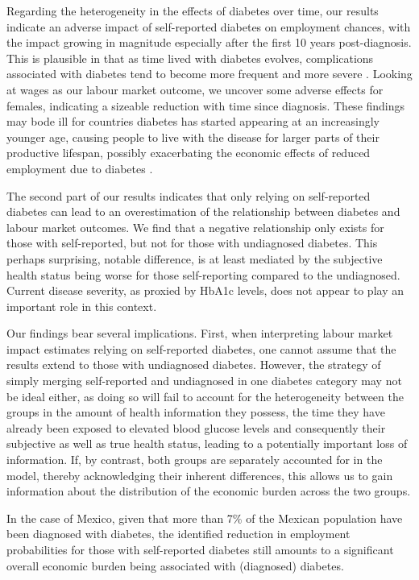 Regarding the heterogeneity in the effects of diabetes over time, our results indicate an adverse impact of self-reported diabetes on employment chances, with the impact growing in magnitude especially after the first 10 years post-diagnosis. This is plausible in that as time lived with diabetes evolves, complications associated with diabetes tend to become more frequent and more severe \parencite{Adler2003}. Looking at wages as our labour market outcome, we uncover some adverse effects for females, indicating a sizeable reduction with time since diagnosis. These findings may bode ill for countries \DIFdelbegin {}\DIFdelend \DIFaddbegin {}\DIFaddend diabetes has started appearing at an increasingly younger age, causing people to live with the disease for larger parts of their productive lifespan, possibly exacerbating the economic effects of reduced employment due to diabetes \parencite{Hu2011,Villalpando2010}.

The second part of our results indicates that only relying on self-reported diabetes can lead to an overestimation of the relationship between diabetes and labour market outcomes. We find that a negative relationship only exists for those with self-reported, but not for those with undiagnosed diabetes. This perhaps surprising, notable difference, is at least mediated by the subjective health status being worse for those self-reporting compared to the undiagnosed. Current disease severity, as proxied by \ac{HbA1c} levels, does not appear to play an important role in this context.

Our findings bear several implications. First, when interpreting labour market impact estimates relying on self-reported diabetes, one cannot assume that the results extend to those with undiagnosed diabetes. However, the strategy of simply merging self-reported and undiagnosed in one diabetes category may not be ideal either, as doing so will fail to account for the heterogeneity between the groups in the amount of health information they possess, the time they have already been exposed to elevated blood glucose levels and consequently their subjective as well as true health status, leading to a potentially important loss of information. If, by contrast, both groups are separately accounted for in the model, thereby acknowledging their inherent differences, this allows us to gain information about the distribution of the economic burden across the two groups. 

In the case of Mexico, given that more than 7\% of the Mexican population have been diagnosed with diabetes, the identified reduction in employment probabilities for those with self-reported diabetes still amounts to a significant overall economic burden being associated with (diagnosed) diabetes.

